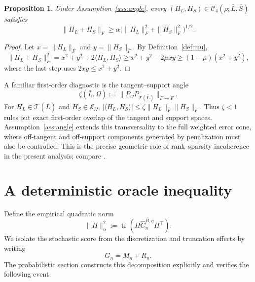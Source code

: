 \documentclass[12pt]{article}
\newtheorem{proposition}{Proposition}
\theoremstyle{definition}
\DeclareMathOperator{\tr}{tr}
\begin{document}
	\begin{proposition}\label{prop:angle}
		Under Assumption~\ref{ass:angle}, every $(H_L,H_S)\in\mathcal C_4(\rho;\bar L,\bar S)$ satisfies
		\begin{equation}
			\|H_L+H_S\|_F\ge\alpha\bigl(\|H_L\|_F^2+\|H_S\|_F^2\bigr)^{1/2}.
			\label{eq:compatibility}	\end{equation}
	\end{proposition}
	
	\begin{proof}
		Let $x=\|H_L\|_F$ and $y=\|H_S\|_F$. By Definition~\ref{def:mu},
		\[\|H_L+H_S\|_F^2	=x^2+y^2+2\langle H_L,H_S\rangle \ge x^2+y^2-2\bar\mu xy
		\ge(1-\bar\mu)(x^2+y^2), \]where the last step uses $2xy\le x^2+y^2$.
	\end{proof}
	
	A familiar first-order diagnostic is the tangent--support angle	\begin{equation}
		\zeta(\bar L,\Omega):=\|P_\Omega P_{\mathcal T(\bar L)}\|_{F\to F}. \label{eq:zeta}
	\end{equation}
	For $H_L\in\mathcal T(\bar L)$ and $H_S\in\mathcal S_\Omega$, $|\langle H_L,H_S\rangle|\le\zeta\|H_L\|_F\|H_S\|_F$. Thus $\zeta<1$ rules out exact first-order overlap of the tangent and support spaces. Assumption~\ref{ass:angle} extends this transversality to the full weighted error cone, where off-tangent and off-support components generated by penalization must also be controlled. This is the precise geometric role of rank--sparsity incoherence in the present analysis; compare \citep{ChandrasekaranSanghaviParriloWillsky2011,AgarwalNegahbanWainwright2012}.
	
	\section{A deterministic oracle inequality} \label{sec:deterministic}
	
	Define the empirical quadratic norm
	\begin{equation}
		\|H\|_n^2:=\tr\!\left(H\widehat C_n^{B,\eta}H^\top\right).
		\label{eq:empnorm}
	\end{equation}
	We isolate the stochastic score from the discretization and truncation effects by writing
	\begin{equation}
		G_n=M_n+R_n.
		\label{eq:score_split}
	\end{equation}
	The probabilistic section constructs this decomposition explicitly and verifies the following event.
	
\end{document}
